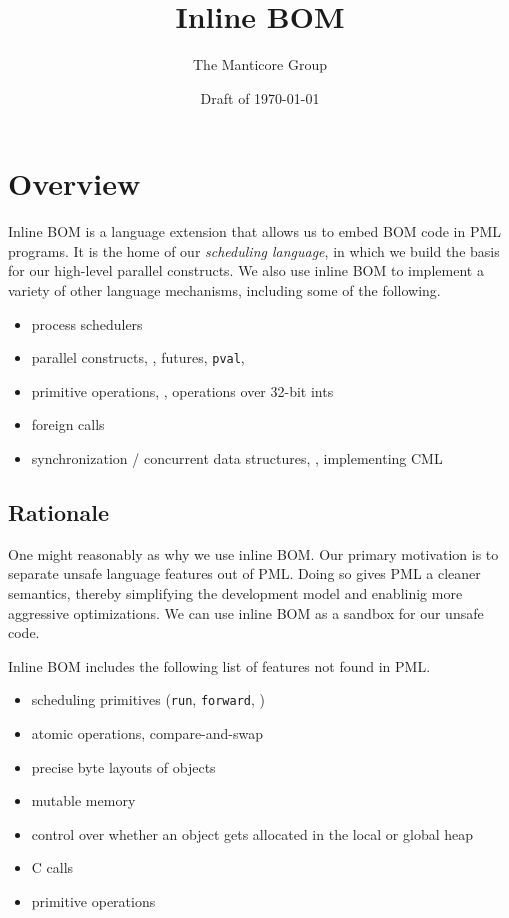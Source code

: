 \documentclass[11pt]{article}
\title{Inline BOM}
\author{The Manticore Group}
\date{Draft of \today}
\begin{document}
\maketitle

\section{Overview}
Inline BOM is a language extension that allows us to embed BOM code in PML programs. It is the home of our \emph{scheduling language}, in which we build the basis for our high-level parallel constructs\cite{manticore-sched-icfp08}. We also use inline BOM to implement a variety of other language mechanisms, including some of the following.
\begin{itemize}
\item process schedulers
\item parallel constructs, \eg{}, futures, \texttt{pval}, \etc{}
\item primitive operations, \eg{}, operations over 32-bit ints
\item foreign calls
\item synchronization / concurrent data structures, \ie{}, implementing CML
\end{itemize}

\subsection{Rationale}
One might reasonably as why we use inline BOM. Our primary motivation is to separate unsafe language features out of PML. Doing so gives PML a cleaner semantics, thereby simplifying the development model and enablinig more aggressive optimizations. We can use inline BOM as a sandbox for our unsafe code.

Inline BOM includes the following list of features not found in PML.
\begin{itemize}
\item scheduling primitives (\texttt{run}, \texttt{forward}, \etc{})
\item atomic operations, \eg{} compare-and-swap
\item precise byte layouts of objects
\item mutable memory
\item control over whether an object gets allocated in the local or global heap
\item C calls
\item primitive operations
\end{itemize}
\end{document}

